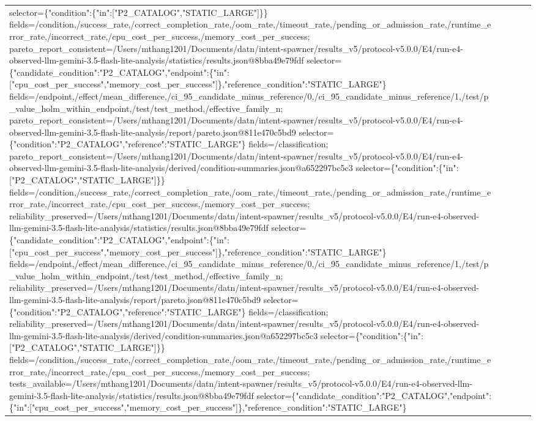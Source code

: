 \begin{tabular}{lllll}
selector=\{"condition":\{"in":["P2\_CATALOG","STATIC\_LARGE"]\}\} fields=/condition,/success\_rate,/correct\_completion\_rate,/oom\_rate,/timeout\_rate,/pending\_or\_admission\_rate,/runtime\_error\_rate,/incorrect\_rate,/cpu\_cost\_per\_success,/memory\_cost\_per\_success; pareto\_report\_consistent=/Users/mthang1201/Documents/datn/intent-spawner/results\_v5/protocol-v5.0.0/E4/run-e4-observed-llm-gemini-3.5-flash-lite-analysis/statistics/results.json@8bba49e79fdf selector=\{"candidate\_condition":"P2\_CATALOG","endpoint":\{"in":["cpu\_cost\_per\_success","memory\_cost\_per\_success"]\},"reference\_condition":"STATIC\_LARGE"\} fields=/endpoint,/effect/mean\_difference,/ci\_95\_candidate\_minus\_reference/0,/ci\_95\_candidate\_minus\_reference/1,/test/p\_value\_holm\_within\_endpoint,/test/test\_method,/effective\_family\_n; pareto\_report\_consistent=/Users/mthang1201/Documents/datn/intent-spawner/results\_v5/protocol-v5.0.0/E4/run-e4-observed-llm-gemini-3.5-flash-lite-analysis/report/pareto.json@811e470c5bd9 selector=\{"condition":"P2\_CATALOG","reference":"STATIC\_LARGE"\} fields=/classification; pareto\_report\_consistent=/Users/mthang1201/Documents/datn/intent-spawner/results\_v5/protocol-v5.0.0/E4/run-e4-observed-llm-gemini-3.5-flash-lite-analysis/derived/condition-summaries.json@a652297bc5c3 selector=\{"condition":\{"in":["P2\_CATALOG","STATIC\_LARGE"]\}\} fields=/condition,/success\_rate,/correct\_completion\_rate,/oom\_rate,/timeout\_rate,/pending\_or\_admission\_rate,/runtime\_error\_rate,/incorrect\_rate,/cpu\_cost\_per\_success,/memory\_cost\_per\_success; reliability\_preserved=/Users/mthang1201/Documents/datn/intent-spawner/results\_v5/protocol-v5.0.0/E4/run-e4-observed-llm-gemini-3.5-flash-lite-analysis/statistics/results.json@8bba49e79fdf selector=\{"candidate\_condition":"P2\_CATALOG","endpoint":\{"in":["cpu\_cost\_per\_success","memory\_cost\_per\_success"]\},"reference\_condition":"STATIC\_LARGE"\} fields=/endpoint,/effect/mean\_difference,/ci\_95\_candidate\_minus\_reference/0,/ci\_95\_candidate\_minus\_reference/1,/test/p\_value\_holm\_within\_endpoint,/test/test\_method,/effective\_family\_n; reliability\_preserved=/Users/mthang1201/Documents/datn/intent-spawner/results\_v5/protocol-v5.0.0/E4/run-e4-observed-llm-gemini-3.5-flash-lite-analysis/report/pareto.json@811e470c5bd9 selector=\{"condition":"P2\_CATALOG","reference":"STATIC\_LARGE"\} fields=/classification; reliability\_preserved=/Users/mthang1201/Documents/datn/intent-spawner/results\_v5/protocol-v5.0.0/E4/run-e4-observed-llm-gemini-3.5-flash-lite-analysis/derived/condition-summaries.json@a652297bc5c3 selector=\{"condition":\{"in":["P2\_CATALOG","STATIC\_LARGE"]\}\} fields=/condition,/success\_rate,/correct\_completion\_rate,/oom\_rate,/timeout\_rate,/pending\_or\_admission\_rate,/runtime\_error\_rate,/incorrect\_rate,/cpu\_cost\_per\_success,/memory\_cost\_per\_success; tests\_available=/Users/mthang1201/Documents/datn/intent-spawner/results\_v5/protocol-v5.0.0/E4/run-e4-observed-llm-gemini-3.5-flash-lite-analysis/statistics/results.json@8bba49e79fdf selector=\{"candidate\_condition":"P2\_CATALOG","endpoint":\{"in":["cpu\_cost\_per\_success","memory\_cost\_per\_success"]\},"reference\_condition":"STATIC\_LARGE"\} 
\end{tabular}
